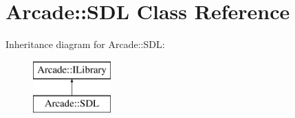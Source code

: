 \hypertarget{class_arcade_1_1_s_d_l}{}\section{Arcade\+:\+:S\+DL Class Reference}
\label{class_arcade_1_1_s_d_l}
Inheritance diagram for Arcade\+:\+:S\+DL\+:\begin{figure}[H]
\begin{center}
\leavevmode
\includegraphics[height=2.000000cm]{class_arcade_1_1_s_d_l}
\end{center}
\end{figure}
